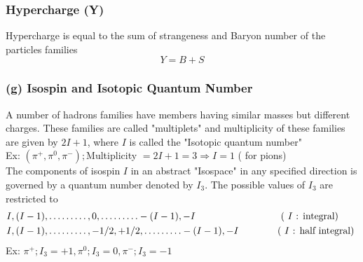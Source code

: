 \subsubsection{Hypercharge (Y)}
Hypercharge is equal to the sum of strangeness and Baryon number of the particles families
$$
Y=B+S
$$
\subsubsection{(g) Isospin and Isotopic Quantum Number}
A number of hadrons families have members having similar masses but different charges. These families are called "multiplets" and multiplicity of these families are given by $2 I+1$, where $I$ is called the "Isotopic quantum number"\\
Ex: $\left(\pi^{+}, \pi^0, \pi^{-}\right) ;$Multiplicity $=2 I+1=3 \Rightarrow I=1$ ( for pions)\\
The components of isospin $I$ in an abstract "Isospace" in any specified direction is governed by a quantum number denoted by $I_3$. The possible values of $I_3$ are restricted to
\begin{align*}
&I,(I-1), \ldots \ldots \ldots, 0, \ldots \ldots \ldots-(I-1),-I\hspace{3cm}\text { ( } I \text { : integral) } \\
&I,(I-1), \ldots \ldots \ldots,-1 / 2,+1 / 2, \ldots \ldots \ldots-(I-1),-I\hspace{1.3cm}\text { ( } I \text { : half integral) }
\end{align*}
Ex: $\pi^{+} ; I_3=+1, \pi^0 ; I_3=0, \pi^{-} ; I_3=-1$\\\\
\renewcommand*{\arraystretch}{1.5}
